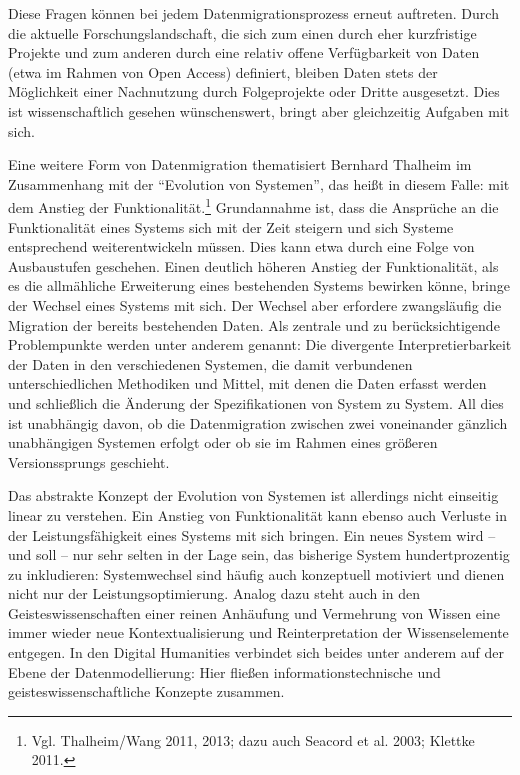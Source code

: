 \documentclass[a4paper,
fontsize=11pt,
oneside,
numbers=noperiodatend,
parskip=half-,
bibliography=totoc,
final
]{scrartcl}
\begin{document}
Diese Fragen können bei jedem Datenmigrationsprozess erneut auftreten.
Durch die aktuelle Forschungslandschaft, die sich zum einen durch eher
kurzfristige Projekte und zum anderen durch eine relativ offene
Verfügbarkeit von Daten (etwa im Rahmen von Open Access) definiert,
bleiben Daten stets der Möglichkeit einer Nachnutzung durch
Folgeprojekte oder Dritte ausgesetzt. Dies ist wissenschaftlich gesehen
wünschenswert, bringt aber gleichzeitig Aufgaben mit sich.

Eine weitere Form von Datenmigration thematisiert Bernhard Thalheim im
Zusammenhang mit der \enquote{Evolution von Systemen}, das heißt in
diesem Falle: mit dem Anstieg der Funktionalität.\footnote{Vgl.
  Thalheim/Wang 2011, 2013; dazu auch Seacord et al. 2003; Klettke 2011.}
Grundannahme ist, dass die Ansprüche an die Funktionalität eines Systems
sich mit der Zeit steigern und sich Systeme entsprechend
weiterentwickeln müssen. Dies kann etwa durch eine Folge von
Ausbaustufen geschehen. Einen deutlich höheren Anstieg der
Funktionalität, als es die allmähliche Erweiterung eines bestehenden
Systems bewirken könne, bringe der Wechsel eines Systems mit sich. Der
Wechsel aber erfordere zwangsläufig die Migration der bereits
bestehenden Daten. Als zentrale und zu berücksichtigende Problempunkte
werden unter anderem genannt: Die divergente Interpretierbarkeit der
Daten in den verschiedenen Systemen, die damit verbundenen
unterschiedlichen Methodiken und Mittel, mit denen die Daten erfasst
werden und schließlich die Änderung der Spezifikationen von System zu
System. All dies ist unabhängig davon, ob die Datenmigration zwischen
zwei voneinander gänzlich unabhängigen Systemen erfolgt oder ob sie im
Rahmen eines größeren Versionssprungs geschieht.

Das abstrakte Konzept der Evolution von Systemen ist allerdings nicht
einseitig linear zu verstehen. Ein Anstieg von Funktionalität kann
ebenso auch Verluste in der Leistungsfähigkeit eines Systems mit sich
bringen. Ein neues System wird -- und soll -- nur sehr selten in der
Lage sein, das bisherige System hundertprozentig zu inkludieren:
Systemwechsel sind häufig auch konzeptuell motiviert und dienen nicht
nur der Leistungsoptimierung. Analog dazu steht auch in den
Geisteswissenschaften einer reinen Anhäufung und Vermehrung von Wissen
eine immer wieder neue Kontextualisierung und Reinterpretation der
Wissenselemente entgegen. In den Digital Humanities verbindet sich
beides unter anderem auf der Ebene der Datenmodellierung: Hier fließen
informationstechnische und geisteswissenschaftliche Konzepte zusammen.
\end{document}
